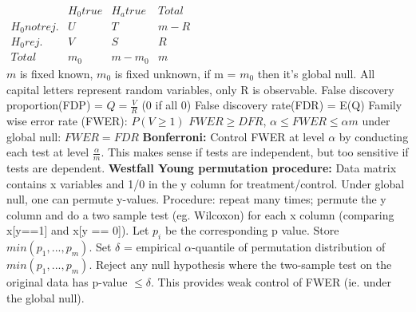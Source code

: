 $\begin{matrix}
& H_0 true & H_a true& Total \\
H_0 not rej. & U & T & m-R\\
H_0rej. & V & S & R \\
Total & m_0 & m-m_0 & m
\end{matrix}$\\
$m$ is fixed known, $m_0$ is fixed unknown, if m = $m_0$ then it's global null. All capital letters represent random variables, only R is observable. 
False discovery proportion(FDP) = $Q = \frac{V}{R}$ (0 if all 0)
False discovery rate(FDR) = E(Q) 
Family wise error rate (FWER): $P(V \geq 1)$
$FWER \geq DFR$, $\alpha \leq FWER \leq \alpha m$ under global null: $FWER = FDR$
\textbf{Bonferroni: } Control FWER at level $\alpha$ by conducting each test at level $\frac{\alpha}{m}$. This makes sense if tests are independent, but too sensitive if tests are dependent. 
\textbf{Westfall Young permutation procedure: } Data matrix contains x variables and 1/0 in the y column for treatment/control. Under global null, one can permute y-values. Procedure: repeat many times; permute the y column and do a two sample test (eg. Wilcoxon) for each x column (comparing x[y==1] and x[y == 0]). Let $p_i$ be the corresponding p value. Store $min(p_1,...,p_m)$. Set $\delta$ = empirical $\alpha$-quantile of permutation distribution of $min(p_1,...,p_m)$. Reject any null hypothesis where the two-sample test on the original data has p-value $\leq \delta$. This provides weak control of FWER (ie. under the global null). 